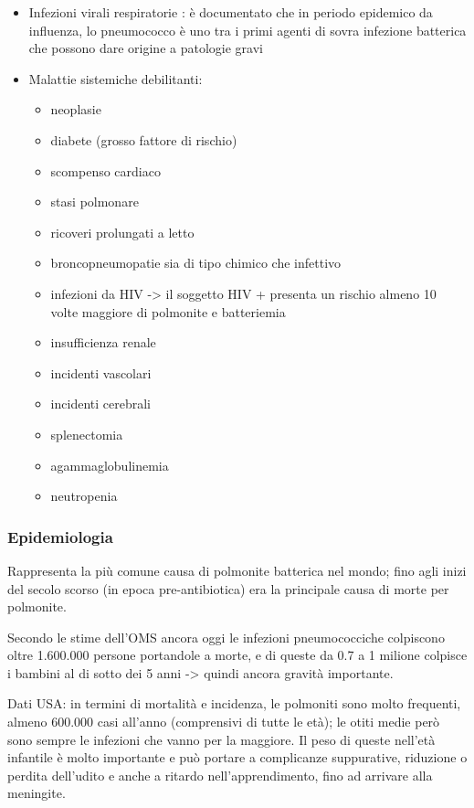\begin{itemize}
\item
  Infezioni virali respiratorie : è documentato che in periodo epidemico
  da influenza, lo pneumococco è uno tra i primi agenti di sovra
  infezione batterica che possono dare origine a patologie gravi
\item
  Malattie sistemiche debilitanti:
\begin{itemize}
\item neoplasie
\item diabete (grosso fattore di rischio)
\item scompenso cardiaco
\item stasi polmonare
\item ricoveri prolungati a letto
\item broncopneumopatie sia di tipo chimico che infettivo
\item infezioni da HIV -> il soggetto HIV + presenta un rischio almeno 10
  volte maggiore di polmonite e batteriemia
\item insufficienza renale
\item incidenti vascolari
\item incidenti cerebrali
\item splenectomia
\item agammaglobulinemia
\item neutropenia
\end{itemize}
\end{itemize}

\subsubsection{Epidemiologia}

  Rappresenta la più comune causa di polmonite batterica nel mondo; fino
  agli inizi del secolo scorso (in epoca pre-antibiotica) era la
  principale causa di morte per polmonite.

  Secondo le stime dell'OMS ancora oggi le infezioni pneumococciche
  colpiscono oltre 1.600.000 persone portandole a morte, e di queste da
  0.7 a 1 milione colpisce i bambini al di sotto dei 5 anni -> quindi
  ancora gravità importante.

  Dati USA: in termini di mortalità e incidenza, le polmoniti sono molto
  frequenti, almeno 600.000 casi all'anno (comprensivi di tutte le età);
  le otiti medie però sono sempre le infezioni che vanno per la
  maggiore. Il peso di queste nell'età infantile è molto importante e
  può portare a complicanze suppurative, riduzione o perdita dell'udito
  e anche a ritardo nell'apprendimento, fino ad arrivare alla meningite.

